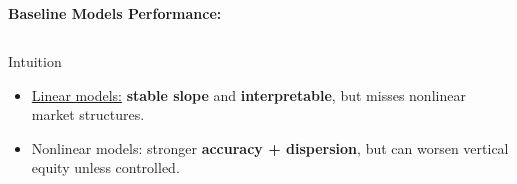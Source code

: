\documentclass[aspectratio=169,10pt]{beamer}
\begin{document}
\begin{frame}{\frameD}
\subsection{\frameD}



\textbf{Baseline Models Performance:}
\medskip
\begin{table}[]
    \centering
    \caption{{ \scriptsize Test set metrics: Accuracy ($R^2$, MAE), horizontal equity (COD, COV), and vertical equity (VEI, PRD, PRB, MKI).}}
\vspace{-5mm}
\end{table}


\begin{columns}%

\begin{block}{  Intuition}
\begin{itemize}
\item \underline{Linear models:} \textbf{stable slope} and \textbf{interpretable}, but {\color{red}misses nonlinear market structures.}
\item Nonlinear models: stronger \textbf{accuracy + dispersion}, but can {\color{red}worsen vertical equity} unless
controlled.
\end{itemize}
\end{block}
  

\end{columns}
\end{frame}
\end{document}
